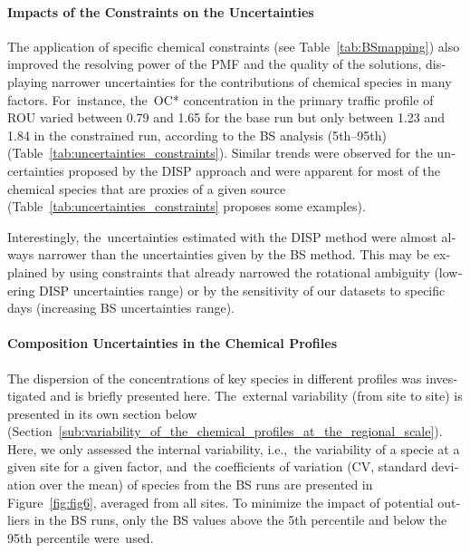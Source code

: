 \begin{otherlanguage}{english}
\paragraph{Impacts of the Constraints on the Uncertainties}%
\label{par:impacts_of_the_constraints_on_the_uncertainties}

The application of specific chemical constraints (see Table~\ref{tab:BSmapping}) also
improved the resolving power of the PMF and the quality of the solutions, displaying
narrower uncertainties for the contributions of chemical species in many factors.
For~instance, the~OC* concentration in the primary traffic profile of ROU   varied between
0.79 and \SI{1.65}{\concum} for the base run but only between 1.23 and \SI{1.84}{\concum}
in the constrained run, according to the BS analysis (5{th}--95{th})
(Table~\ref{tab:uncertainties_constraints}). Similar trends were observed for the
uncertainties proposed by the DISP approach and were apparent for most of the chemical
species that are proxies of a given source (Table~\ref{tab:uncertainties_constraints}
proposes some examples).

Interestingly, the~uncertainties estimated with the DISP method were almost always
narrower than the uncertainties given by the BS method. This may be explained by using
constraints that already narrowed the rotational ambiguity (lowering DISP uncertainties
range) or by the sensitivity of our datasets to specific days (increasing BS uncertainties
range).

\paragraph{Composition Uncertainties in the Chemical Profiles}%
\label{par:composition_uncertainties_in_the_chemical_profiles}

The dispersion of the concentrations of key species in different profiles was investigated
and is briefly presented here. The~external variability (from site to site) is presented
in its own section below
(Section~\ref{sub:variability_of_the_chemical_profiles_at_the_regional_scale}).  Here, we
only assessed the internal variability, i.e.,~the variability of a specie at a given site
for a given factor, and~the coefficients of variation (CV, standard deviation over the
mean) of species from the BS runs are presented in Figure~\ref{fig:fig6}, averaged from
all sites.      To minimize the impact of potential outliers in the BS runs, only the BS
values above the 5{th} percentile and below the 95{th} percentile were~used.


\end{otherlanguage}
